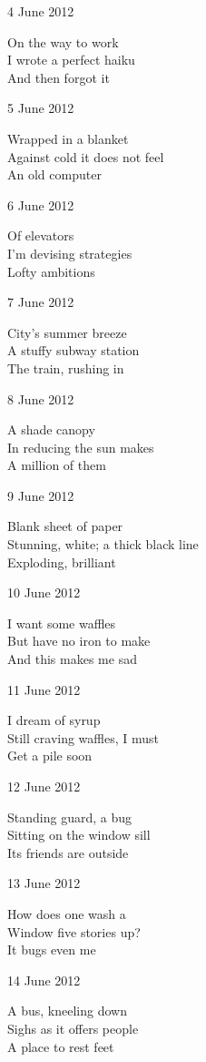 \documentclass[12pt]{article}
\begin{document}
4 June 2012

On the way to work  \\
I wrote a perfect haiku \\
And then forgot it

5 June 2012

Wrapped in a blanket \\
Against cold it does not feel \\
An old computer

6 June 2012

Of elevators \\
I'm devising strategies \\
Lofty ambitions

7 June 2012

City's summer breeze \\
A stuffy subway station \\
The train, rushing in

8 June 2012

A shade canopy \\
In reducing the sun makes \\
A million of them

9 June 2012

Blank sheet of paper \\
Stunning, white; a thick black line \\
Exploding, brilliant

\newpage

10 June 2012

I want some waffles \\
But have no iron to make \\
And this makes me sad

11 June 2012

I dream of syrup \\
Still craving waffles, I must \\
Get a pile soon

12 June 2012

Standing guard, a bug \\
Sitting on the window sill \\
Its friends are outside

13 June 2012

How does one wash a \\
Window five stories up? \\
It bugs even me

14 June 2012

A bus, kneeling down \\
Sighs as it offers people \\
A place to rest feet
\end{document}
